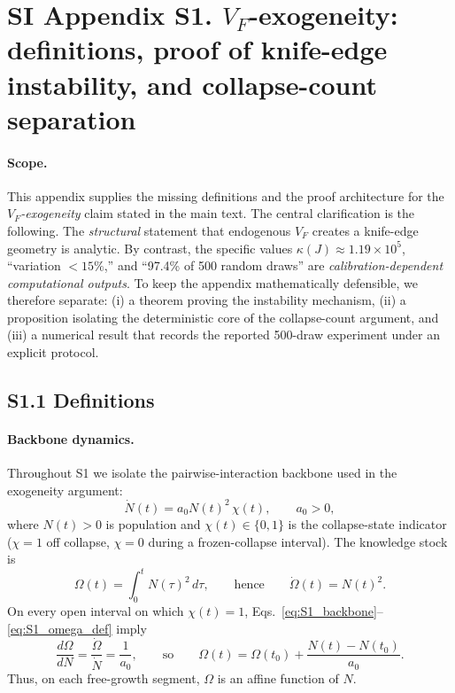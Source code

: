 \documentclass[11pt]{article}
\begin{document}

\section*{SI Appendix S1. $V_F$-exogeneity: definitions, proof of knife-edge instability, and collapse-count separation}

\paragraph{Scope.}
This appendix supplies the missing definitions and the proof architecture for the
\emph{\(V_F\)-exogeneity} claim stated in the main text. The central clarification is the following.
The \emph{structural} statement that endogenous \(V_F\) creates a knife-edge geometry is analytic.
By contrast, the specific values \(\kappa(J)\approx 1.19\times 10^{5}\), ``variation \(<15\%\),''
and ``97.4\% of 500 random draws'' are \emph{calibration-dependent computational outputs}.
To keep the appendix mathematically defensible, we therefore separate:
(i) a theorem proving the instability mechanism,
(ii) a proposition isolating the deterministic core of the collapse-count argument, and
(iii) a numerical result that records the reported 500-draw experiment under an explicit protocol.

\subsection*{S1.1 Definitions}

\paragraph{Backbone dynamics.}
Throughout S1 we isolate the pairwise-interaction backbone used in the exogeneity argument:
\begin{equation}
\dot N(t)=a_0 N(t)^2 \,\chi(t),\qquad a_0>0,
\label{eq:S1_backbone}
\end{equation}
where \(N(t)>0\) is population and \(\chi(t)\in\{0,1\}\) is the collapse-state indicator
(\(\chi=1\) off collapse, \(\chi=0\) during a frozen-collapse interval).
The knowledge stock is
\begin{equation}
\Omega(t)=\int_0^t N(\tau)^2\,d\tau,
\qquad\text{hence}\qquad
\dot\Omega(t)=N(t)^2.
\label{eq:S1_omega_def}
\end{equation}
On every open interval on which \(\chi(t)=1\), Eqs.~\eqref{eq:S1_backbone}--\eqref{eq:S1_omega_def}
imply
\begin{equation}
\frac{d\Omega}{dN}=
\frac{\dot\Omega}{\dot N}=
\frac{1}{a_0},
\qquad\text{so}\qquad
\Omega(t)=\Omega(t_0)+\frac{N(t)-N(t_0)}{a_0}.
\label{eq:S1_omega_affine}
\end{equation}
Thus, on each free-growth segment, \(\Omega\) is an affine function of \(N\).
\end{document}
